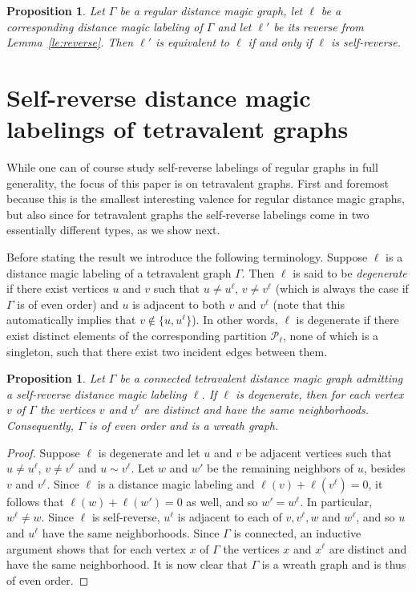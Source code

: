 \documentclass[11 pt,english]{article}
\newcommand{\G}{\Gamma}
\newcommand{\cP}{\mathcal{P}}
\newtheorem{proposition}[theorem]{Proposition}
\theoremstyle{definition}
\begin{document}
\begin{proposition}
\label{pro:SRname}
Let $\G$ be a regular distance magic graph, let $\ell$ be a corresponding distance magic labeling of $\G$ and let $\ell'$ be its reverse from Lemma~\ref{le:reverse}. Then $\ell'$ is equivalent to $\ell$ if and only if $\ell$ is self-reverse.
\end{proposition}

\section{Self-reverse distance magic labelings of tetravalent graphs}
\label{sec:tetravalent}

While one can of course study self-reverse labelings of regular graphs in full generality, the focus of this paper is on tetravalent graphs. First and foremost because this is the smallest interesting valence for regular distance magic graphs, but also since for tetravalent graphs the self-reverse labelings come in two essentially different types, as we show next. 

Before stating the result we introduce the following terminology. Suppose $\ell$ is a distance magic labeling of a tetravalent graph $\G$. Then $\ell$ is said to be {\em degenerate} if there exist vertices $u$ and $v$ such that $u \neq u^\ell$, $v \neq v^\ell$ (which is always the case if $\G$ is of even order) and $u$ is adjacent to both $v$ and $v^\ell$ (note that this automatically implies that $v \notin \{u, u^\ell\}$). In other words, $\ell$ is degenerate if there exist distinct elements of the corresponding partition $\cP_\ell$, none of which is a singleton, such that there exist two incident edges between them.

\begin{proposition}
\label{pro:degenerate}
Let $\G$ be a connected tetravalent distance magic graph admitting a self-reverse distance magic labeling $\ell$. If $\ell$ is degenerate, then for each vertex $v$ of $\G$ the vertices $v$ and $v^\ell$ are distinct and have the same neighborhoods. Consequently, $\G$ is of even order and is a wreath graph.
\end{proposition}

\begin{proof}
Suppose $\ell$ is degenerate and let $u$ and $v$ be adjacent vertices such that $u \neq u^\ell$, $v \neq v^\ell$ and $u \sim  v^\ell$. Let $w$ and $w'$ be the remaining neighbors of $u$, besides $v$ and $v^\ell$. Since $\ell$ is a distance magic labeling and $\ell(v) + \ell(v^\ell) = 0$, it follows that $\ell(w) + \ell(w') = 0$ as well, and so $w' = w^\ell$. In particular, $w^\ell \neq w$. Since $\ell$ is self-reverse, $u^\ell$ is adjacent to each of $v, v^\ell, w$ and $w^\ell$, and so $u$ and $u^\ell$ have the same neighborhoods. Since $\G$ is connected, an inductive argument shows that for each vertex $x$ of $\G$ the vertices $x$ and $x^\ell$ are distinct and have the same neighborhood. It is now clear that $\G$ is a wreath graph and is thus of even order.
\end{proof}
\end{document}
